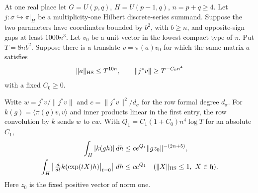 \begin{auxlemma}\label{lem:fitted-real-projection}
At one real place let \(G=U(p,q)\), \(H=U(p-1,q)\), \(n=p+q\ge4\).
Let \(j:\sigma\hookrightarrow\pi|_H\) be a multiplicity-one Hilbert
discrete-series summand. Suppose the two parameters have coordinates
bounded by \(b^2\), with \(b\ge n\), and opposite-sign gaps at least
\(1000n^3\). Let \(v_0\) be a unit vector in the lowest compact type
of \(\pi\). Put \(T=8nb^2\). Suppose there is a translate \(v=\pi(a)v_0\)
for which the same matrix \(a\) satisfies
\begin{equation}\label{eq:fitted-real-projection}
       \|a\|_{\rm HS}\le T^{10n},\qquad
       \|j^*v\|\ge T^{-C_0 n^4}
\end{equation}
with a fixed \(C_0\ge0\).

Write \(w=j^*v/\|j^*v\|\) and
\(c=\|j^*v\|^2/d_\sigma\) for the row formal degree \(d_\sigma\).
For \(k(g)=\langle\pi(g)v,v\rangle\) and inner products linear in
the first entry, the row convolution by \(\bar k\) sends \(w\) to \(cw\).
With \(Q_1=C_1(1+C_0)n^4\log T\) for an absolute \(C_1\),
\[
 \begin{aligned}\int_H|k(gh)|\,dh&\le ce^{Q_1}\|gz_0\|^{-(2n+5)},\\
 \int_H\left|\left.\tfrac{d}{dt} k(\exp(tX)h)\right|_{t=0}\right|\,dh
    &\le ce^{Q_1}\quad (\|X\|_{\rm HS}\le1,\ X\in\mathfrak h).\end{aligned}
\]
Here \(z_0\) is the fixed positive vector of norm one.
\end{auxlemma}
